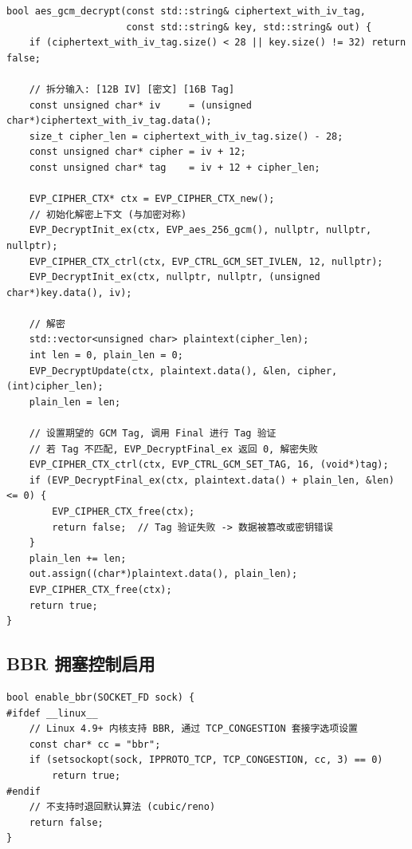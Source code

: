 \documentclass[12pt]{article}
\begin{document}
\begin{lstlisting}[caption={AES-256-GCM 解密与 Tag 验证 (utils.cpp)},label={lst:aes-dec}]
bool aes_gcm_decrypt(const std::string& ciphertext_with_iv_tag,
                     const std::string& key, std::string& out) {
    if (ciphertext_with_iv_tag.size() < 28 || key.size() != 32) return false;

    // 拆分输入: [12B IV] [密文] [16B Tag]
    const unsigned char* iv     = (unsigned char*)ciphertext_with_iv_tag.data();
    size_t cipher_len = ciphertext_with_iv_tag.size() - 28;
    const unsigned char* cipher = iv + 12;
    const unsigned char* tag    = iv + 12 + cipher_len;

    EVP_CIPHER_CTX* ctx = EVP_CIPHER_CTX_new();
    // 初始化解密上下文 (与加密对称)
    EVP_DecryptInit_ex(ctx, EVP_aes_256_gcm(), nullptr, nullptr, nullptr);
    EVP_CIPHER_CTX_ctrl(ctx, EVP_CTRL_GCM_SET_IVLEN, 12, nullptr);
    EVP_DecryptInit_ex(ctx, nullptr, nullptr, (unsigned char*)key.data(), iv);

    // 解密
    std::vector<unsigned char> plaintext(cipher_len);
    int len = 0, plain_len = 0;
    EVP_DecryptUpdate(ctx, plaintext.data(), &len, cipher, (int)cipher_len);
    plain_len = len;

    // 设置期望的 GCM Tag, 调用 Final 进行 Tag 验证
    // 若 Tag 不匹配, EVP_DecryptFinal_ex 返回 0, 解密失败
    EVP_CIPHER_CTX_ctrl(ctx, EVP_CTRL_GCM_SET_TAG, 16, (void*)tag);
    if (EVP_DecryptFinal_ex(ctx, plaintext.data() + plain_len, &len) <= 0) {
        EVP_CIPHER_CTX_free(ctx);
        return false;  // Tag 验证失败 -> 数据被篡改或密钥错误
    }
    plain_len += len;
    out.assign((char*)plaintext.data(), plain_len);
    EVP_CIPHER_CTX_free(ctx);
    return true;
}
\end{lstlisting}

\subsection{BBR 拥塞控制启用}

\begin{lstlisting}[caption={BBR 拥塞控制设置 (platform.cpp)},label={lst:bbr}]
bool enable_bbr(SOCKET_FD sock) {
#ifdef __linux__
    // Linux 4.9+ 内核支持 BBR, 通过 TCP_CONGESTION 套接字选项设置
    const char* cc = "bbr";
    if (setsockopt(sock, IPPROTO_TCP, TCP_CONGESTION, cc, 3) == 0)
        return true;
#endif
    // 不支持时退回默认算法 (cubic/reno)
    return false;
}
\end{lstlisting}
\end{document}
